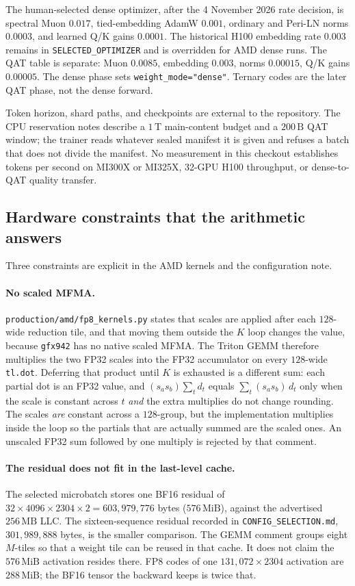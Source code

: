 \documentclass[11pt]{article}
\DeclareRobustCommand{\code}[1]{\texttt{#1}}
\newcommand{\MiB}{\,\mathrm{MiB}}
\begin{document}
The human-selected dense optimizer, after the 4 November 2026 rate decision,
is spectral Muon \(0.017\), tied-embedding AdamW \(0.001\), ordinary and
Peri-LN norms \(0.0003\), and learned Q/K gains \(0.0001\). The historical
H100 embedding rate \(0.003\) remains in \code{SELECTED\_OPTIMIZER} and is
overridden for AMD dense runs. The QAT table is separate: Muon \(0.0085\),
embedding \(0.003\), norms \(0.00015\), Q/K gains \(0.00005\). The dense
phase sets \code{weight\_mode="dense"}. Ternary codes are the later QAT
phase, not the dense forward.

Token horizon, shard paths, and checkpoints are external to the repository.
The CPU reservation notes describe a \(1\,\mathrm{T}\) main-content budget
and a \(200\,\mathrm{B}\) QAT window; the trainer reads whatever sealed
manifest it is given and refuses a batch that does not divide the manifest.
No measurement in this checkout establishes tokens per second on MI300X or
MI325X, 32-GPU H100 throughput, or dense-to-QAT quality transfer.

\subsection{Hardware constraints that the arithmetic answers}

Three constraints are explicit in the AMD kernels and the configuration note.

\paragraph{No scaled MFMA.}
\code{production/amd/fp8\_kernels.py} states that scales are applied after
each \(128\)-wide reduction tile, and that moving them outside the \(K\) loop
changes the value, because \code{gfx942} has no native scaled MFMA. The
Triton GEMM therefore multiplies the two FP32 scales into the FP32
accumulator on every \(128\)-wide \code{tl.dot}. Deferring that product until
\(K\) is exhausted is a different sum: each partial dot is an FP32 value, and
\((s_a s_b)\sum_t d_t\) equals \(\sum_t (s_a s_b)\,d_t\) only when the scale
is constant across \(t\) \emph{and} the extra multiplies do not change
rounding. The scales \emph{are} constant across a \(128\)-group, but the
implementation multiplies inside the loop so the partials that are actually
summed are the scaled ones. An unscaled FP32 sum followed by one multiply is
rejected by that comment.

\paragraph{The residual does not fit in the last-level cache.}
The selected microbatch stores one BF16 residual of
\(32\times 4096\times 2304\times 2=603{,}979{,}776\) bytes
(\(576\MiB\)), against the advertised \(256\,\mathrm{MB}\) LLC. The
sixteen-sequence residual recorded in \code{CONFIG\_SELECTION.md},
\(301{,}989{,}888\) bytes, is the smaller comparison. The GEMM comment
groups eight \(M\)-tiles so that a weight tile can be reused in that cache.
It does not claim the \(576\MiB\) activation resides there. FP8 codes of one
\(131{,}072\times 2304\) activation are \(288\MiB\); the BF16 tensor the
backward keeps is twice that.
\end{document}
